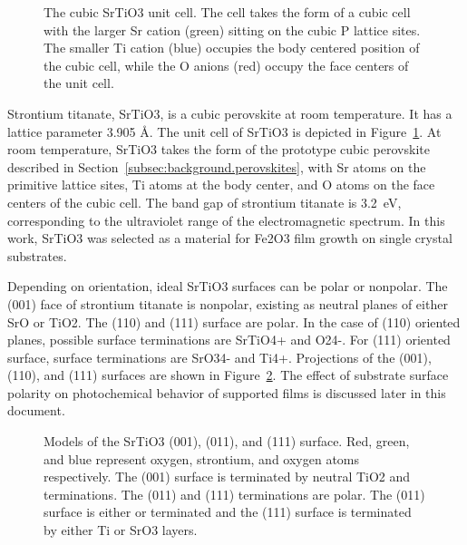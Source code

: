 \documentclass[12pt,%
              twoside,
               letterpaper]{uiothesis}
\begin{document}
\begin{figure}
\begin{center}
\caption[Cubic SrTiO3 unit cell]{%
	The cubic SrTiO3 unit cell. The cell takes the form of a 
	cubic cell with the larger Sr cation (green) sitting on the 
	cubic P lattice sites. The smaller Ti cation (blue) occupies 
	the body centered position of the cubic cell, while the O anions 
	(red) occupy the face centers of the unit cell.}
\label{fig:stocell}
\end{center}
\end{figure}

Strontium titanate, SrTiO3, is a cubic perovskite at room temperature. It has a
lattice parameter 3.905 \si{\angstrom}. The unit cell of SrTiO3 is depicted in
Figure~\ref{fig:stocell}. At room temperature, SrTiO3 takes the form of the prototype
cubic perovskite described in Section~\ref{subsec:background.perovskites}, with Sr atoms on
the primitive lattice sites, Ti atoms at the body center, and O atoms on the face centers
of the cubic cell. The band gap of strontium titanate is 3.2~eV,\cite{Cardona:1965vw}
corresponding to the ultraviolet range of the electromagnetic spectrum. In this work,
SrTiO3 was selected as a material for Fe2O3 film growth on single crystal
substrates. 
 
Depending on orientation, ideal SrTiO3 surfaces can be polar or nonpolar. The (001)
face of strontium titanate is nonpolar, existing as neutral planes of either SrO or
TiO2. The (110) and (111) surface are polar. In the case of (110) oriented planes,
possible surface terminations are SrTiO4+ and O24-. For (111) oriented
surface, surface terminations are SrO34- and Ti4+. Projections of the
(001), (110), and (111) surfaces are shown in Figure~\ref{fig:stoterms}. The effect of
substrate surface polarity on photochemical behavior of supported films is discussed later
in this document.

\begin{figure}
		\caption[Low-index SrTiO3 surface terminations]{%
			Models of the SrTiO3 (001), (011), and (111) surface. 
			Red, green, and blue represent oxygen, strontium, and oxygen 
			atoms respectively. The (001) surface is terminated by neutral 
			TiO2 and  terminations. The (011) and (111) 
			terminations are polar. The (011) surface is either  
			or  terminated and the (111) surface is terminated by 
			either Ti or SrO3 layers.}
	\label{fig:stoterms}
\end{figure}
\end{document}
